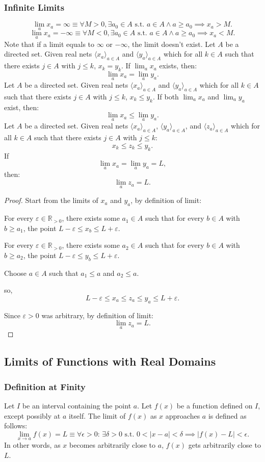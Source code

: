 \documentclass[a4paper,12pt]{report}
\begin{document}
\subsubsection{Infinite Limits}
\[\lim_{a}x_a=\infty \equiv \forall M > 0, \exists a_0 \in A \text{\ s.t.\ } a\in A\land a\geq a_0 \implies x_a > M.\]
\[\lim_{a}x_a=-\infty \equiv \forall M < 0, \exists a_0 \in A \text{\ s.t.\ } a\in A\land a\geq a_0 \implies x_a < M.\]
Note that if a limit equals to $\infty$ or $-\infty$, the limit doesn't exist.
Let $A$ be a directed set. Given real nets $\langle x_a\rangle_{a\in A}$ and $\langle y_a\rangle_{a\in A}$ which for all $k\in A$ such that there exists $j\in A$ with $j\leq k$, $x_k=y_k$. If $\lim_{a}x_a$ exists, then:
\[\lim_{a}x_a=\lim_{a}y_a.\]
Let $A$ be a directed set. Given real nets $\langle x_a\rangle_{a\in A}$ and $\langle y_a\rangle_{a\in A}$ which for all $k\in A$ such that there exists $j\in A$ with $j\leq k$, $x_k\leq y_k$. If both $\lim_{a}x_a$ and $\lim_{a}y_a$ exist, then:
\[\lim_{a}x_a\leq\lim_{a}y_a.\]
Let $A$ be a directed set. Given real nets $\langle x_a\rangle_{a\in A}$, $\langle y_a\rangle_{a\in A}$, and $\langle z_a\rangle_{a\in A}$ which for all $k\in A$ such that there exists $j\in A$ with $j\leq k$:
\[x_k\leq z_k\leq y_k.\]
If
\[\lim_{a}x_a=\lim_{a}y_a=L,\]
then: 
\[\lim_{a}z_a=L.\]
\begin{proof}
Start from the limits of $x_a$ and $y_a$, by definition of limit:

For every $\varepsilon\in\mathbb{R}_{>0}$, there exists some $a_1\in A$ such that for every $b\in A$ with $b\geq a_1$, the point $L-\varepsilon\leq x_b\leq L+\varepsilon$.

For every $\varepsilon\in\mathbb{R}_{>0}$, there exists some $a_2\in A$ such that for every $b\in A$ with $b\geq a_2$, the point $L-\varepsilon\leq y_b\leq L+\varepsilon$.

Choose $a\in A$ such that $a_1\leq a$ and $a_2\leq a$.

so,
\[L-\varepsilon\leq x_{a}\leq z_{a}\leq y_{a}\leq L+\varepsilon.\]

Since $\varepsilon > 0$ was arbitrary, by definition of limit:
\[\lim_{a}z_a=L.\]
\end{proof}
\subsection{Limits of Functions with Real Domains}
\subsubsection{Definition at Finity}
Let \(I\) be an interval containing the point \(a\). Let \( f(x) \) be a function defined on \(I\), except possibly at \(a\) itself. The limit of \( f(x) \) as \( x \) approaches \( a \) is defined as follows:
\[\lim_{x \to a} f(x) = L \equiv \forall \epsilon > 0:\, \exists \delta > 0 \text{\ s.t.\ } 0 < |x - a| < \delta \implies |f(x) - L| < \epsilon.\]
In other words, as \(x\) becomes arbitrarily close to \(a\), \(f(x)\) gets arbitrarily close to \(L\).
\end{document}
